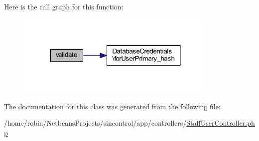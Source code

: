 Here is the call graph for this function\+:
\nopagebreak
\begin{figure}[H]
\begin{center}
\leavevmode
\includegraphics[width=275pt]{class_staff_user_controller_a7bdb48df8ccc4764c0fe460b3c5bcd5f_cgraph}
\end{center}
\end{figure}




The documentation for this class was generated from the following file\+:\begin{DoxyCompactItemize}
\item 
/home/robin/\+Netbeans\+Projects/sincontrol/app/controllers/\hyperlink{_staff_user_controller_8php}{Staff\+User\+Controller.\+php}\end{DoxyCompactItemize}
